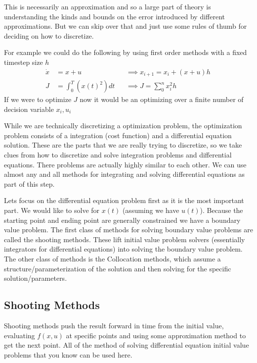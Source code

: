 \documentclass[a4paper, 10pt, twocolumn]{article}
\begin{document}
This is necessarily an approximation and so a large part of theory is understanding the kinds and bounds on the error introduced by different approximations. But we can skip over that and just use some rules of thumb for deciding on how to discretize.

For example we could do the following by using first order methods with a fixed timestep size \(h\)
\begin{align*}
    \dot{x} & = x + u                            &
            & \implies
    x_{i + 1}  = x_i + (x + u) h\,                 \\
    J\,     & =\int_0^T \left( x(t)^2 \right) dt &
            & \implies
    J          = \sum_0^n x_i^2 h
\end{align*}
If we were to optimize \(J\) now it would be an optimizing over a finite number of decision variable \(x_i, u_i\)

While we are technically discretizing a optimization problem, the optimization problem consists of a integration (cost function) and a differential equation solution. These are the parts that we are really trying to discretize, so we take clues from how to discretize and solve integration problems and differential equations. There problems are actually highly similar to each other. We can use almost any and all methods for integrating and solving differential equations as part of this step.

Lets focus on the differential equation problem first as it is the most important part. We would like to solve for \(x(t)\) (assuming we have \(u(t)\)). Because the starting point and ending point are generally constrained we have a boundary value problem. The first class of methods for solving boundary value problems are called the shooting methods. These lift initial value problem solvers (essentially integrators for differential equations) into solving the boundary value problem. The other class of methods is the Collocation methods, which assume a structure/parameterization of the solution and then solving for the specific solution/parameters.

\subsection{Shooting Methods}

Shooting methods push the result forward in time from the initial value, evaluating \(f(x,u)\) at specific points and using some approximation method to get the next point. All of the method of solving differential equation initial value problems that you know can be used here.
\end{document}
